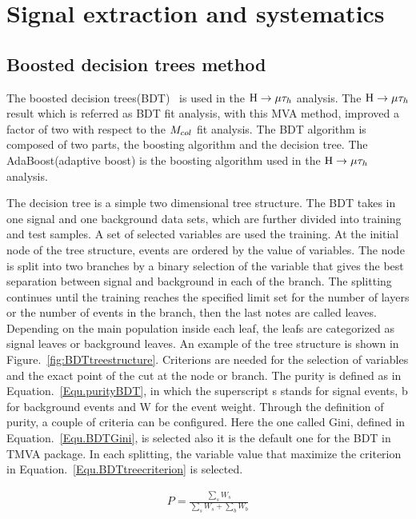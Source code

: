 
\chapter{Signal extraction and systematics}

\section{Boosted decision trees method} \label{BDTchaper}
The boosted decision trees(BDT)~\cite{BDTboostPI,TMVAnote} is used in the $\mathrm{H}\to \mu\tau_{h}$ analysis. The $\mathrm{H}\to \mu\tau_{h}$ result which is referred as BDT fit analysis, with this MVA method, improved a factor of two with respect to the $M_{col}$ fit analysis. The BDT algorithm is composed of two parts, the boosting algorithm and the decision tree. The AdaBoost(adaptive boost) is the boosting algorithm used in the $\mathrm{H}\to \mu\tau_{h}$ analysis. 

The decision tree is a simple two dimensional tree structure. The BDT takes in one signal and one background data sets, which are further divided into training and test samples. A set of selected variables are used the training. At the initial node of the tree structure, events are ordered by the value of variables. The node is split into two branches by a binary selection of the variable that gives the best separation between signal and background in each of the branch. The splitting continues until the training reaches the specified limit set for the number of layers or the number of events in the branch, then the last notes are called leaves. Depending on the main population inside each leaf, the leafs are categorized as signal leaves or background leaves. An example of the tree structure is shown in Figure.~\ref{fig:BDTtreestructure}.  Criterions are needed for the selection of variables and the exact point of the cut at the node or branch. The purity is defined as in Equation.~\ref{Equ.purityBDT}, in which the superscript s stands for signal events, b for background events and W for the event weight. Through the definition of purity, a couple of criteria can be configured. Here the one called Gini, defined in Equation.~\ref{Equ.BDTGini}, is selected also it is the default one for the BDT in TMVA package. In each splitting, the variable value that maximize the criterion in Equation.~\ref{Equ.BDTtreecriterion} is selected.  


\begin{align} \label{Equ.purityBDT}
P=\frac{\sum_{s}W_{s}}{\sum_{s}W_{s}+\sum_{b}W_{b}}
\end{align}

